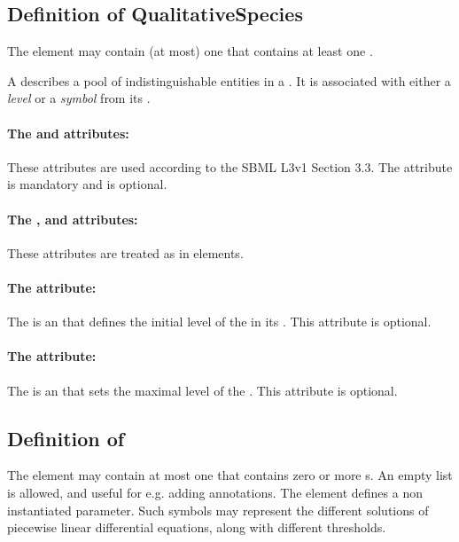 \subsection*{Definition of \textsf{\textbf{\hypertarget{QualitativeSpecies}{QualitativeSpecies}}}} %

The  element may contain (at most) one  that contains at least one .

A  describes a pool of indistinguishable entities in a . It is associated with either a \emph{level} or a \emph{symbol} from its .

\paragraph{The  and  attributes:}
These attributes are used according to the SBML L3v1 Section 3.3. The attribute  is mandatory and  is optional. 

\paragraph{The ,  and  attributes:}
These attributes are treated as in  elements.

\paragraph{The   attribute:}
The  is an  that defines the initial level of the  in its . This attribute is optional.

\paragraph{The  attribute:}
The  is an  that sets the maximal level of the . This attribute is optional.

\bigskip
\subsection*{Definition of } %
The  element may contain at most one  that contains zero or more s. An empty list is allowed, and useful for e.g. adding annotations.
The  element defines a non instantiated parameter. Such symbols may represent the different solutions of piecewise linear differential equations, along with different thresholds.

